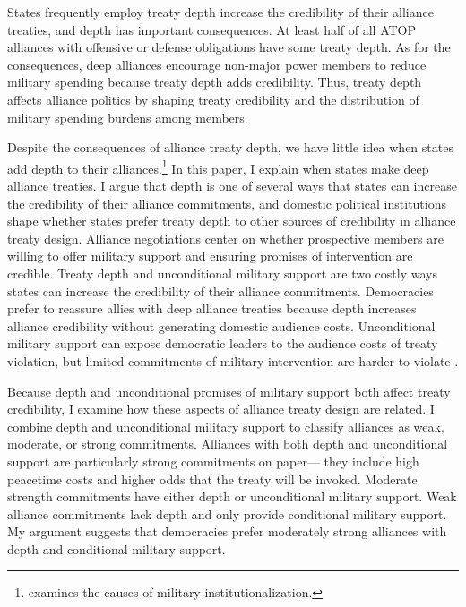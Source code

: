 \documentclass[12pt]{article}
\begin{document}
 
States frequently employ treaty depth increase the credibility of their alliance treaties, and depth has important consequences. 
At least half of all ATOP alliances with offensive or defense obligations have some treaty depth.
As for the consequences, deep alliances encourage non-major power members to reduce military spending because treaty depth adds credibility.  
Thus, treaty depth affects alliance politics by shaping treaty credibility and the distribution of military spending burdens among members. 


Despite the consequences of alliance treaty depth, we have little idea when states add depth to their alliances.\footnote{\citet{Mattes2012} examines the causes of military institutionalization.}
In this paper, I explain when states make deep alliance treaties.
I argue that depth is one of several ways that states can increase the credibility of their alliance commitments, and domestic political institutions shape whether states prefer treaty depth to other sources of credibility in alliance treaty design. 
Alliance negotiations center on whether prospective members are willing to offer military support \citep{Poast2019a} and ensuring promises of intervention are credible. 
Treaty depth and unconditional military support are two costly ways states can increase the credibility of their alliance commitments.
Democracies prefer to reassure allies with deep alliance treaties because depth increases alliance credibility without generating domestic audience costs. 
Unconditional military support can expose democratic leaders to the audience costs of treaty violation, but limited commitments of military intervention are harder to violate \citep{Mattes2012, Chibaetal2015}.


Because depth and unconditional promises of military support both affect treaty credibility, I examine how these aspects of alliance treaty design are related. 
I combine depth and unconditional military support to classify alliances as weak, moderate, or strong commitments. 
Alliances with both depth and unconditional support are particularly strong commitments on paper--- they include high peacetime costs and higher odds that the treaty will be invoked. 
Moderate strength commitments have either depth or unconditional military support.
Weak alliance commitments lack depth and only provide conditional military support.  
My argument suggests that democracies prefer moderately strong alliances with depth and conditional military support.  
\end{document}
